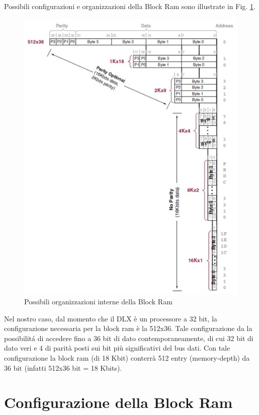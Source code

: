 Possibili configurazioni e organizzazioni della Block Ram sono illustrate in Fig. \ref{fig:ram_org}.\\

\begin{figure}[!h]
\centering
\includegraphics[width=\textwidth]{img/blockRam/organInterna.jpg}
\caption{Possibili organizzazioni interne della Block Ram}
\label{fig:ram_org}
\end{figure}

Nel nostro caso, dal momento che il DLX \`e un processore a 32 bit, la configurazione necessaria per la block ram \`e la 512x36. Tale configurazione da la possibilit\'a di accedere fino a 36 bit di dato contemporaneamente, di cui 32 bit di dato veri e 4 di parit\`a posti sui bit pi\`u significativi del bus dati. Con tale configurazione la block ram (di 18 Kbit) conterr\`a 512 entry (memory-depth) da 36 bit (infatti 512x36 bit = 18 Kbits).

\section{Configurazione della Block Ram}

